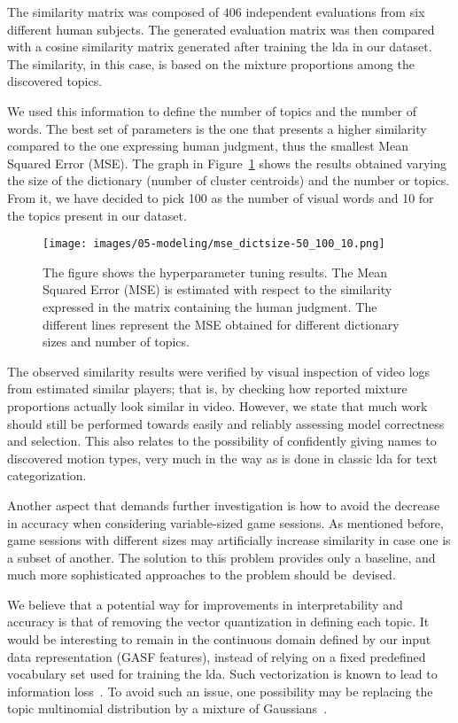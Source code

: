 The similarity matrix was composed of $406$ independent evaluations from six different human subjects. The generated evaluation matrix was then compared with a cosine similarity matrix generated after training the \gls{lda} in our dataset. The similarity, in this case, is based on the mixture proportions among the discovered topics. 

We used this information to define the number of topics and the number of words. The best set of parameters is the one that presents a higher similarity compared to the one expressing human judgment, thus the smallest Mean Squared Error (MSE). The graph in Figure~\ref{hyperparameter_results} shows the results obtained varying the size of the dictionary (number of cluster centroids) and the number or topics. From it, we have decided to pick 100 as the number of visual words and 10 for the topics present in our dataset.

\begin{figure}[H]
	\centering
	\texttt{[image: images/05-modeling/mse\_dictsize-50\_100\_10.png]}
	\caption{The figure shows the hyperparameter tuning results. The Mean Squared Error (MSE) is estimated with respect to the similarity expressed in the matrix containing the human judgment. The different lines represent the MSE obtained for different dictionary sizes and number of topics.}
  \label{hyperparameter_results}
\end{figure}

The observed similarity results were verified by visual inspection of video logs from estimated similar players; that is, by checking how reported mixture proportions actually look similar in video. However, we state that much work should still be performed towards easily and reliably assessing model correctness and selection. This also relates to the possibility of confidently giving names to discovered motion types, very much in the way as is done in classic \gls{lda} for text categorization.

Another aspect that demands further investigation is how to avoid the decrease in accuracy when considering variable-sized game sessions. As mentioned before, game sessions with different sizes may artificially increase similarity in case one is a subset of another. The solution to this problem provides only a baseline, and much more sophisticated approaches to the problem should be~devised.

We believe that a potential way for improvements in interpretability and accuracy is that of removing the vector quantization in defining each topic. It would be interesting to remain in the continuous domain defined by our input data representation (GASF features), instead of relying on a fixed predefined vocabulary set used for training the \gls{lda}. Such vectorization is known to lead to information loss~\cite{hu_latent_2012}. To avoid such an issue, one possibility may be replacing the topic multinomial distribution by a mixture of Gaussians~\cite{hu_latent_2012}.

